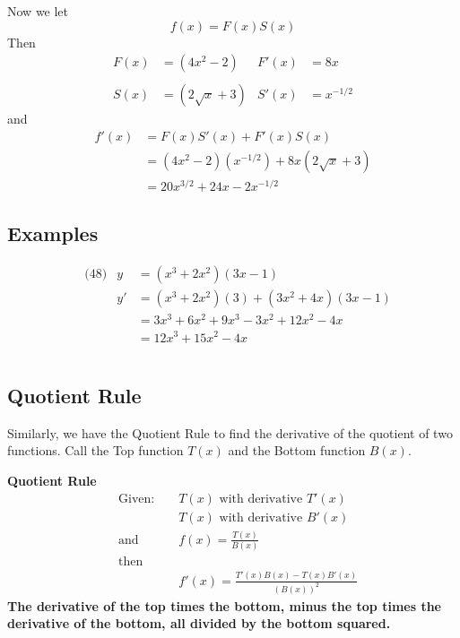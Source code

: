 \documentclass[14pt]{extarticle}
\begin{document}
Now we let
$$f(x) = F(x)S(x)$$
Then
\begin{align*}
	F(x) &= (4x^2 -2) & F'(x)&=8x \\\\
	S(x) &= (2\sqrt{x}+3) & S'(x)&= x^{-1/2}
\end{align*}
and
\begin{align*}
	f'(x) &= F(x)S'(x) + F'(x)S(x) \\
	&= (4x^2 -2)(x^{-1/2}) + 8x(2\sqrt{x}+3) \\
	&= 20x^{3/2} + 24x - 2x^{-1/2}
\end{align*}

\subsection*{Examples}
\begin{align*}
	&\text{(48)} &y &= (x^3 + 2x^2)(3x-1) \\
	&			&y' &= (x^3 + 2x^2)(3) + (3x^2 + 4x)(3x -1) \\
	&			&    &= 3x^3 +6x^2 +  9x^3 - 3x^2 + 12x^2 -4x\\
	&			&    &= 12x^3 + 15x^2 - 4x\\\\
\end{align*}


\subsection*{Quotient Rule}
Similarly, we have the Quotient Rule to find the derivative of  the quotient of two functions. Call the Top function $T(x)$ and the Bottom function $B(x)$.

\begin{tcolorbox}[enhanced jigsaw,colback=bg,boxrule=0pt,arc=0pt]
	\textbf{Quotient Rule}
	\begin{align*}
		&\text{Given: } & &T(x) \text{ with derivative } T'(x) \\
		& & &T(x) \text{ with derivative } B'(x) \\
		&\text{and } & &f(x) = \frac{T(x)}{B(x)} \\
		&\text{then }\\
		& & &f'(x) = \frac{T'(x)B(x) - T(x)B'(x)}{(B(x))^2}
	\end{align*}
	\textbf{The derivative of the top times the bottom, minus the top times the derivative of the bottom, all divided by the bottom squared.}
\end{tcolorbox}
\end{document}
